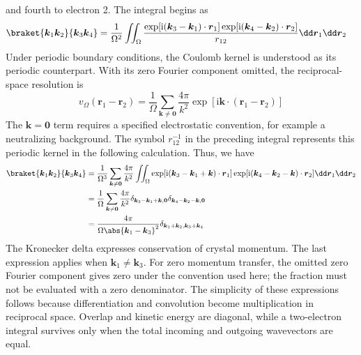 \documentclass[11pt,a4paper,titlepage]{article}
\numberwithin{equation}{section}
\newcommand{\bk}{\boldsymbol{k}}
\newcommand{\br}{\boldsymbol{r}}
\newcommand{\bO}{\boldsymbol{0}}
\newcommand{\ii}{\mathrm{i}}
\begin{document}
and fourth to electron 2. The integral begins as
\begin{equation}
\begin{split}
  \braket{\bk_1\bk_2}{\bk_3\bk_4}
  &=\frac{1}{\Omega^2}\iint_\Omega
  \frac{\exp[\ii(\bk_3-\bk_1)\cdot\br_1]
        \exp[\ii(\bk_4-\bk_2)\cdot\br_2]}
       {r_{12}}\dd\br_1\dd\br_2
\end{split}
\end{equation}
Under periodic boundary conditions, the Coulomb kernel is understood as its
periodic counterpart. With its zero Fourier component omitted, the
reciprocal-space resolution is
\begin{equation}
  v_\Omega(\br_1-\br_2)=\frac{1}{\Omega}\sum_{\bk\ne\bO}
  \frac{4\pi}{k^2}\exp[\ii\bk\cdot(\br_1-\br_2)]
\end{equation}
The $\bk=\bO$ term requires a specified electrostatic convention, for
example a neutralizing background. The symbol $r_{12}^{-1}$ in the preceding
integral represents this periodic kernel in the following calculation.
Thus, we have
\begin{equation}
\begin{split}
  \braket{\bk_1\bk_2}{\bk_3\bk_4}
  &=\frac{1}{\Omega^3}\sum_{\bk\ne\bO}\frac{4\pi}{k^2}
  \iint_\Omega\exp[\ii(\bk_3-\bk_1+\bk)\cdot\br_1]
  \exp[\ii(\bk_4-\bk_2-\bk)\cdot\br_2]\dd\br_1\dd\br_2\\
  &=\frac{1}{\Omega}\sum_{\bk\ne\bO}\frac{4\pi}{k^2}
  \delta_{\bk_3-\bk_1+\bk,\bO}
  \delta_{\bk_4-\bk_2-\bk,\bO}\\
  &=\frac{4\pi}{\Omega\abs{\bk_1-\bk_3}^2}
  \delta_{\bk_1+\bk_2,\bk_3+\bk_4}
\end{split}
\end{equation}
The Kronecker delta expresses conservation of crystal momentum.
The last expression applies when $\bk_1\ne\bk_3$. For zero momentum
transfer, the omitted zero Fourier component gives zero under the convention
used here; the fraction must not be evaluated with a zero denominator.
The simplicity of these expressions follows because differentiation and
convolution become multiplication in reciprocal space. Overlap and kinetic
energy are diagonal, while a two-electron integral survives only when the
total incoming and outgoing wavevectors are equal.
\end{document}
